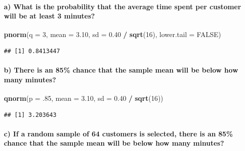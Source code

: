 \documentclass[]{article}
\newenvironment{Shaded}{\begin{snugshade}}{\end{snugshade}}
\newcommand{\KeywordTok}[1]{\textcolor[rgb]{0.13,0.29,0.53}{\textbf{#1}}}
\newcommand{\DataTypeTok}[1]{\textcolor[rgb]{0.13,0.29,0.53}{#1}}
\newcommand{\DecValTok}[1]{\textcolor[rgb]{0.00,0.00,0.81}{#1}}
\newcommand{\FloatTok}[1]{\textcolor[rgb]{0.00,0.00,0.81}{#1}}
\newcommand{\StringTok}[1]{\textcolor[rgb]{0.31,0.60,0.02}{#1}}
\newcommand{\OtherTok}[1]{\textcolor[rgb]{0.56,0.35,0.01}{#1}}
\newcommand{\OperatorTok}[1]{\textcolor[rgb]{0.81,0.36,0.00}{\textbf{#1}}}
\newcommand{\NormalTok}[1]{#1}
\let\oldparagraph\paragraph
\renewcommand{\paragraph}[1]{\oldparagraph{#1}\mbox{}}
\begin{document}
\paragraph{a) What is the probability that the average time spent per
customer will be at least 3
minutes?}\label{a-what-is-the-probability-that-the-average-time-spent-per-customer-will-be-at-least-3-minutes}

\begin{Shaded}
\begin{Highlighting}[]
\KeywordTok{pnorm}\NormalTok{(}\DataTypeTok{q =} \DecValTok{3}\NormalTok{, }\DataTypeTok{mean =} \FloatTok{3.10}\NormalTok{, }\DataTypeTok{sd =} \FloatTok{0.40} \OperatorTok{/}\StringTok{ }\KeywordTok{sqrt}\NormalTok{(}\DecValTok{16}\NormalTok{), }\DataTypeTok{lower.tail =} \OtherTok{FALSE}\NormalTok{)}
\end{Highlighting}
\end{Shaded}

\begin{verbatim}
## [1] 0.8413447
\end{verbatim}

\paragraph{b) There is an 85\% chance that the sample mean will be below
how many
minutes?}\label{b-there-is-an-85-chance-that-the-sample-mean-will-be-below-how-many-minutes}

\begin{Shaded}
\begin{Highlighting}[]
\KeywordTok{qnorm}\NormalTok{(}\DataTypeTok{p =}\NormalTok{ .}\DecValTok{85}\NormalTok{, }\DataTypeTok{mean =} \FloatTok{3.10}\NormalTok{, }\DataTypeTok{sd =} \FloatTok{0.40} \OperatorTok{/}\StringTok{ }\KeywordTok{sqrt}\NormalTok{(}\DecValTok{16}\NormalTok{))}
\end{Highlighting}
\end{Shaded}

\begin{verbatim}
## [1] 3.203643
\end{verbatim}

\paragraph{c) If a random sample of 64 customers is selected, there is
an 85\% chance that the sample mean will be below how many
minutes?}\label{c-if-a-random-sample-of-64-customers-is-selected-there-is-an-85-chance-that-the-sample-mean-will-be-below-how-many-minutes}
\end{document}
